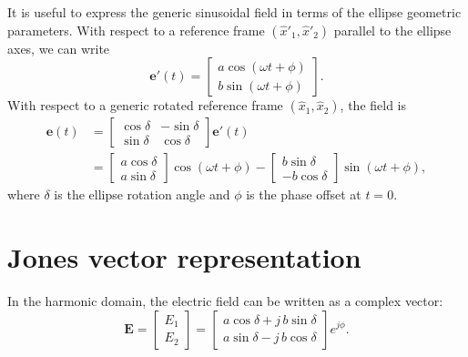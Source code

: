 It is useful to express the generic sinusoidal field in terms of the ellipse geometric parameters.
With respect to a reference frame $(\hat{x}'_1, \hat{x}'_2)$ parallel to the ellipse axes, we can write
\begin{equation}
    \mathbf{e}'(t)
    =
    \begin{bmatrix}
        a\cos(\omega t + \phi)\\[4pt]
        b\sin(\omega t + \phi)
    \end{bmatrix}.
\end{equation}
With respect to a generic rotated reference frame $(\hat{x}_1,\hat{x}_2)$, the field is
\begin{align}
    \mathbf{e}(t)
    &= 
    \begin{bmatrix}
        \cos\delta & -\sin\delta\\
        \sin\delta & \cos\delta
    \end{bmatrix}
    \mathbf{e}'(t)\\[4pt]
    &=
    \begin{bmatrix}
        a\cos\delta\\ a\sin\delta
    \end{bmatrix}\!\cos(\omega t + \phi)
    -
    \begin{bmatrix}
        b\sin\delta\\ -b\cos\delta
    \end{bmatrix}\!\sin(\omega t + \phi),
\end{align}
where $\delta$ is the ellipse rotation angle and $\phi$ is the phase offset at $t=0$.

\section{Jones vector representation}

In the harmonic domain, the electric field can be written as a complex vector:
\begin{equation}
    \mathbf{E}
    =
    \begin{bmatrix}
        E_1 \\ E_2
    \end{bmatrix}
    =
    \begin{bmatrix}
        a\cos\delta + j\,b\sin\delta\\[4pt]
        a\sin\delta - j\,b\cos\delta
    \end{bmatrix}
    e^{j\phi}.
\end{equation}

